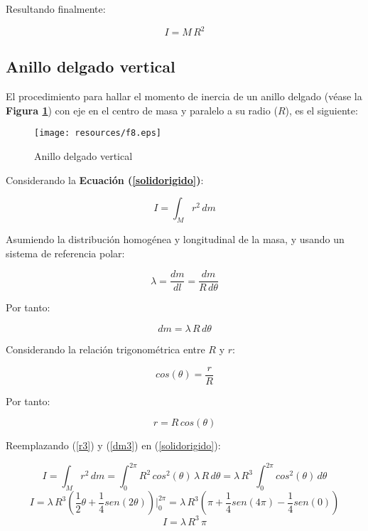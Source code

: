\documentclass[letter,twoside,11pt]{article}
\begin{document}
Resultando finalmente:

\begin{equation}
    I = M\, R^2
\end{equation}

\subsection{Anillo delgado vertical}
El procedimiento para hallar el momento de inercia de un anillo delgado (véase
la \textbf{Figura \ref{figura8}}) con eje en el centro de masa y paralelo a
su radio ($R$), es el siguiente:

\begin{figure}
\centering
\texttt{[image: resources/f8.eps]}
\caption{Anillo delgado vertical}
\label{figura8}
\end{figure}

Considerando la \textbf{Ecuación (\ref{solidorigido})}:

\begin{equation*}
    I = \int_{M} r^2\, dm
\tag{4}
\end{equation*}

Asumiendo la distribución homogénea y longitudinal de la masa, y usando un
sistema de referencia polar:

\begin{equation*}
    \lambda = \frac{dm}{dl} = \frac{dm}{R\, d\theta}
\end{equation*}

Por tanto:

\begin{equation}
    dm = \lambda\, R\, d\theta
\label{dm3}
\end{equation}

Considerando la relación trigonométrica entre $R$ y $r$:

\begin{equation*}
    cos (\theta) = \frac{r}{R}
\end{equation*}

Por tanto:

\begin{equation}
    r = R\, cos(\theta)
\label{r3}
\end{equation}

Reemplazando (\ref{r3}) y (\ref{dm3}) en (\ref{solidorigido}):

\begin{equation*}
    I = \int_{M} r^2\, dm = \int_{0}^{2\pi} R^2\, cos^2(\theta)\, \lambda\, R\, d\theta = \lambda\, R^3\, \int_{0}^{2\pi} cos^2(\theta)\, d\theta
\end{equation*}
\begin{equation*}
    I = \lambda\, R^3 \left( \frac{1}{2} \theta + \frac{1}{4} sen (2\theta) \right) \Biggr|_{0}^{2\pi} = \lambda\, R^3 \left( \pi + \frac{1}{4} sen(4\pi) - \frac{1}{4} sen(0) \right)
\end{equation*}
\begin{equation}
    I = \lambda\, R^3\, \pi
\label{resultado3}
\end{equation}
\end{document}
